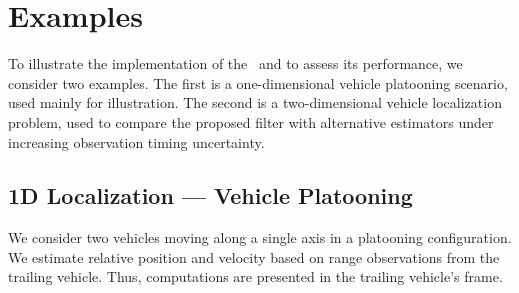 \documentclass{ifacconf}
\begin{document}

\section{Examples}\label{sec:examples}
To illustrate the implementation of the \czesmf\ and to assess its performance, we consider two examples. The first is a one-dimensional vehicle platooning scenario, used mainly for illustration. The second is a two-dimensional vehicle localization problem, used to compare the proposed filter with alternative estimators under increasing observation timing uncertainty.



\subsection{1D Localization --- Vehicle Platooning }\label{sec:example_1D}
\vspace{-0.2cm}
We consider two vehicles moving along a single axis in a platooning configuration.
We estimate relative position and velocity based on range observations from the trailing vehicle.
Thus, computations are presented in the trailing vehicle's frame.
\end{document}
